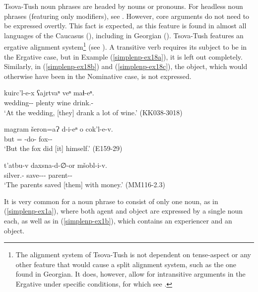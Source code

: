 Tsova-Tush noun phrases are headed by nouns or pronouns. For headless noun phrases (featuring only modifiers), see . However, core arguments do not need to be expressed overtly. This fact is expected, as this feature is found in almost all languages of the Caucasus (\cite[9]{polinskyintro}), including in Georgian (\cite[43--36]{tuite98}). Tsova-Tush features an ergative alignment system\footnote{The alignment system of Tsova-Tush is not dependent on tense-aspect or any other feature that would cause a split alignment system, such as the one found in Georgian. It does, however, allow for intransitive arguments in the Ergative under specific conditions, for which see . } (see ).
A transitive verb requires its subject to be in the Ergative case, but in Example (\ref{simplenp-ex18a}), it is left out completely. Similarly, in (\ref{simplenp-ex18b}) and (\ref{simplenp-ex18c}), the object, which would otherwise have been in the Nominative case, is not expressed.

\begin{exe}
	\ex\label{simplenp-ex18}
	\begin{xlist}

			\ex\label{simplenp-ex18a}
			\gll  kuirc'l-e-x ʕajrtvaⁿ veⁿ maɬ-eⁿ. \\
			wedding-{\Obl}-{\Cont} plenty wine drink.{\Pfv}-{\Aor} \\
			\trans `At the wedding, [they] drank a lot of wine.' 
			\hfill (KK038-3018)

		

			\ex\label{simplenp-ex18b}
			\gll magram šeron=aɁ d-i-eⁿ o cok'l-e-v. \\
			but {\Refl}={\Emph} {\D}-do-{\Aor} {\Dist} fox-{\Obl}-{\Erg} \\
			\trans `But the fox did [it] himself.'
			\hfill (E159-29)

		

			\ex\label{simplenp-ex18c}
			\gll t'atbu-v daxsna-d-∅-or mšobl-i-v. \\
			silver.{\Obl}-{\Ins} save-{\D}-{\Tr}-{{\Imprf}} parent-{\Pl}-{\Erg} \\ 
			\trans `The parents saved [them] with money.'
			\hfill (MM116-2.3)

		
	\end{xlist}
\end{exe}

It is very common for a noun phrase to consist of only one noun, as in (\ref{simplenp-ex1a}), where both agent and object are expressed by a single noun each, as well as in (\ref{simplenp-ex1b}), which contains an experiencer and an object.

